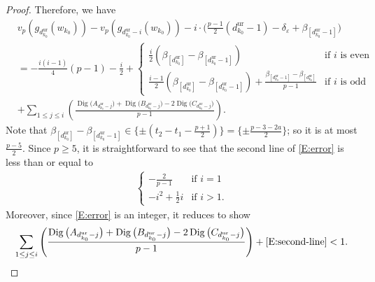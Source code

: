 \documentclass[12pt]{amsart}
\theoremstyle{definition}
\numberwithin{equation}{subsection}
\DeclareMathOperator{\Dig}{Dig}
\newcommand{\unr}{\mathrm{ur}}
\begin{document}
\begin{proof}
Therefore, we have
\begin{eqnarray}
\label{E:error}
&v_p(g_{d_{k_0}^\unr}(w_{k_0})) - v_p(g_{d_{k_0}^\unr-i}(w_{k_0})) -  i \cdot \big( \frac{p-1}2(d_{k_0}^\unr-1)-\delta_\varepsilon + \beta_{[d_{k_0}^\unr -1]}\big) \\
\nonumber &
= -\frac{i(i-1)}{4}(p-1)-\frac{i}{2}+ 
\begin{cases}
\frac{i}{2} (\beta_{[d_{k_0}^\unr]}-\beta_{[d_{k_0}^\unr -1]}) & \textrm{if $i$ is even}\\
\frac{i-1}{2} (\beta_{[d_{k_0}^\unr ]}-\beta_{[d_{k_0}^\unr -1]})+ \frac{\beta_{[d_{k_0}^\unr -1]}-\beta_{[d_{k_0}^\unr]}}{p-1} & \textrm{if $i$ is odd}
\end{cases}\\
\nonumber
& + \displaystyle \sum_{1 \leq j \leq i} \left( \frac{\Dig \big(A_{d_{k_0}^\unr - j}\big) +\Dig\big(B_{d_{k_0}^\unr - j}\big) - 2 \Dig\big(C_{d_{k_0}^\unr - j}\big)}{p-1}\right).
\end{eqnarray}
Note that $\beta_{[d_{k_0}^\unr]}-\beta_{[d_{k_0}^\unr-1]} \in \{ \pm( t_2-t_1-\frac{p+1}{2})\} = \{\pm \frac{p-3-2a}{2}\}$; so it is at most $\frac{p-5}{2}$. Since $p\geq5$, it is straightforward to see that the second line of \eqref{E:error} is less than or equal to 
\begin{eqnarray}
\label{E:second-line}
\begin{cases}
-\frac{2}{p-1} & \textrm{if $i=1$}\\
-i^2+\tfrac12 i & \textrm{if $i>1$}.
\end{cases}
\end{eqnarray}
Moreover, since \eqref{E:error} is an integer, it reduces to show 
\begin{equation}
\label{E:main-est}
\displaystyle \sum_{1 \leq j \leq i} \left( \frac{\Dig \big(A_{d_{k_0}^\unr - j}\big) +\Dig\big(B_{d_{k_0}^\unr - j}\big) - 2 \Dig\big(C_{d_{k_0}^\unr - j}\big)}{p-1}\right) + \eqref{E:second-line}<1. 
\end{equation}



\end{proof}
\end{document}
